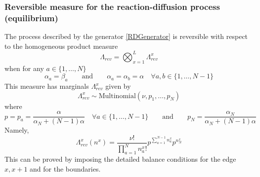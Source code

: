 \documentclass[10pt]{article}
\numberwithin{equation}{section}
\numberwithin{equation}{subsection}
\newcommand{\twoj}{\nu}
\begin{document}
\subsubsection{Reversible measure for the reaction-diffusion process (equilibrium)} 
The process described by the generator \eqref{RDGenerator} is reversible with respect to the homogeneous product measure \begin{equation}\label{reversibleMeasureRD}
	\Lambda_{rev}=\bigotimes_{x=1}^{L}\Lambda_{rev}^{x}
\end{equation}
when for any $a\in\{1,\ldots,N\}$
\begin{equation}\label{reversibilityConditionRD}
	\alpha_{a}=\beta_{a}\qquad\text{and}\qquad \alpha_{a}=\alpha_{b}=\alpha \quad \forall a,b\in \{1,\ldots,N-1\}
\end{equation}
This measure has marginals $\Lambda_{rev}^{x}$ given by 
\begin{equation}
	\Lambda^{x}_{rev}\sim \text{Multinomial}\left(\twoj,p_{1},\ldots,p_{N}\right)
\end{equation}
where 
\begin{equation}
	p=p_{a}=\frac{\alpha}{\alpha_{N}+(N-1)\alpha}\quad \forall a\in \{1,\ldots,N-1\}\qquad \text{and}\qquad p_{N}=\frac{\alpha_{N}}{\alpha_{N}+(N-1)\alpha}
\end{equation}
Namely,
\begin{equation}
	\Lambda_{rev}^{x}(n^{x})=\frac{\nu!}{\prod_{a=1}^{N}n_{a}^{x}!}p^{\sum_{a=1}^{N-1}n_{a}^{x}}p^{n_{N}^{x}}
\end{equation}
This can be proved by imposing the detailed balance conditions for the edge $x,x+1$ and for the boundaries. %
\end{document}
